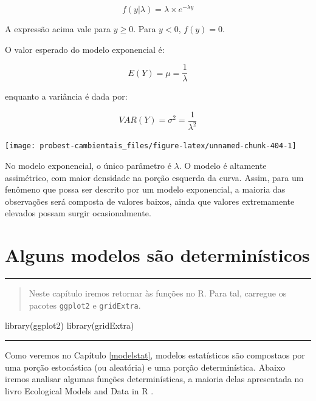 \documentclass[
]{book}
\newenvironment{Shaded}{\begin{snugshade}}{\end{snugshade}}
\newcommand{\FunctionTok}[1]{\textcolor[rgb]{0.00,0.00,0.00}{#1}}
\newcommand{\NormalTok}[1]{#1}
\begin{document}
\[f(y|\lambda) = \lambda \times e^{-\lambda y}\]

A expressão acima vale para \(y \ge 0\). Para \(y < 0\), \(f(y) = 0\).

O valor esperado do modelo exponencial é:

\[E(Y) = \mu = \frac{1}{\lambda}\]

enquanto a variância é dada por:

\[VAR(Y) = \sigma^2 = \frac{1}{\lambda^2}\]

\begin{center}\texttt{[image: probest-cambientais\_files/figure-latex/unnamed-chunk-404-1]} \end{center}

No modelo exponencial, o único parâmetro é \(\lambda\). O modelo é altamente assimétrico, com maior densidade na porção esquerda da curva. Assim, para um fenômeno que possa ser descrito por um modelo exponencial, a maioria das observações será composta de valores baixos, ainda que valores extremamente elevados possam surgir ocasionalmente.

\hypertarget{detmodel}{%
\chapter{Alguns modelos são determinísticos}\label{detmodel}}

\begin{center}\rule{0.5\linewidth}{0.5pt}\end{center}

\begin{quote}
Neste capítulo iremos retornar às funções no R. Para tal, carregue os pacotes \texttt{ggplot2} e \texttt{gridExtra}.
\end{quote}

\begin{Shaded}
\begin{Highlighting}[]
\FunctionTok{library}\NormalTok{(ggplot2)}
\FunctionTok{library}\NormalTok{(gridExtra)}
\end{Highlighting}
\end{Shaded}

\begin{center}\rule{0.5\linewidth}{0.5pt}\end{center}

Como veremos no Capítulo \ref{modelstat}, modelos estatísticos são compostaos por uma porção estocástica (ou aleatória) e uma porção determinística. Abaixo iremos analisar algumas funções determinísticas, a maioria delas apresentada no livro Ecological Models and Data in R \citep{bolker2008ecological}.
\end{document}
